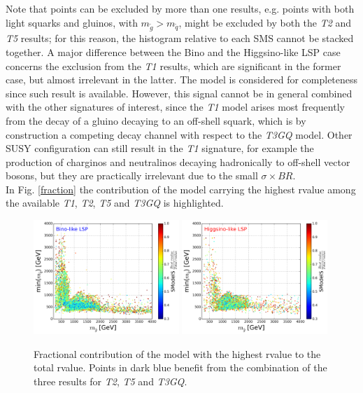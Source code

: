 \documentclass[epj,nopacs,fleqn]{svjour}
\begin{document}
%
Note that points can be excluded by more than one results, e.g. points with both light squarks and gluinos, with $m_{\tilde g} > m_{\tilde q}$, might be excluded by both the \textit{T2} and \textit{T5} results; for this reason, the histogram relative to each SMS cannot be stacked together. A major difference between the Bino and the Higgsino-like LSP case concerns the exclusion from the \textit{T1} results, which are significant in the former case, but almost irrelevant in the latter. The model is considered for completeness since such result is available. However, this signal cannot be in general combined with the other signatures of interest, since the \textit{T1} model arises most frequently from the decay of a gluino decaying to an off-shell squark, which is by construction a competing decay channel with respect to the \textit{T3GQ} model. Other SUSY configuration can still result in the \textit{T1} signature, for example the production of charginos and neutralinos decaying hadronically to off-shell vector bosons, but they are practically irrelevant due to the small $\sigma \times BR$.  
\\
In Fig. \ref{fraction} the contribution of the model carrying the highest rvalue among the available \textit{T1}, \textit{T2}, \textit{T5} and \textit{T3GQ} is highlighted. 
\begin{figure}[!]
\begin{center}
\subfigure
\includegraphics[width=0.49\textwidth]{PLOTS/Weights/BINO_rValus_Glu_Sq_Ratio.png}
\subfigure
{\includegraphics[width=0.49\textwidth]{PLOTS/Weights/HIGGSINO_rValus_Glu_Sq_Ratio.png}}
\end{center}
\caption{Fractional contribution of the model with the highest rvalue to the total rvalue. Points in dark blue benefit from the combination of the three results for \textit{T2}, \textit{T5} and \textit{T3GQ}.} 
\label{fractions}
\end{figure}
\end{document}
